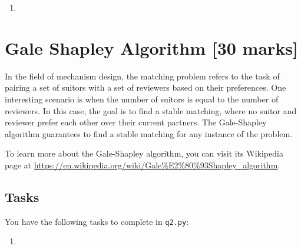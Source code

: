 \documentclass[12pt]{article}
\begin{document}
\begin{enumerate}
    \item 
\end{enumerate}

\newpage
\section{Gale Shapley Algorithm \hfill [30 marks]}

In the field of mechanism design, the matching problem refers to the task of pairing a set of suitors with a set of reviewers based on their preferences. One interesting scenario is when the number of suitors is equal to the number of reviewers. In this case, the goal is to find a stable matching, where no suitor and reviewer prefer each other over their current partners. The Gale-Shapley algorithm guarantees to find a stable matching for any instance of the problem.

To learn more about the Gale-Shapley algorithm, you can visit its Wikipedia page at \url{https://en.wikipedia.org/wiki/Gale%E2%80%93Shapley_algorithm}.





\subsection{Tasks}
You have the following tasks to complete in \verb|q2.py|:

\begin{enumerate}
    \item 
\end{enumerate}
\end{document}
